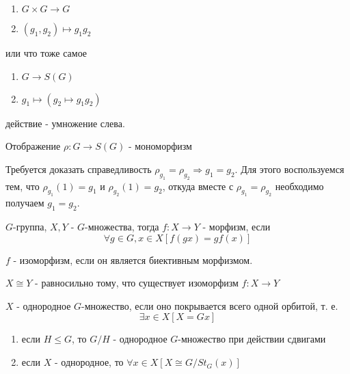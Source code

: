 \begin{enumerate}
\item $G\times G \rightarrow G$

\item $\left(g_1, g_2\right) \mapsto g_1g_2$
\end{enumerate}

или что тоже самое

\begin{enumerate}
\item $G \rightarrow S\left(G\right)$

\item $g_1 \mapsto \left(g_2 \mapsto g_1g_2\right)$
\end{enumerate}

действие - умножение слева.

\begin{Th}[Кэли]
Отображение $\rho : G \rightarrow S\left(G\right)$ - мономорфизм
\end{Th}

\begin{Proof}
Требуется доказать справедливость $\rho_{g_1} = \rho_{g_2} \Rightarrow g_1 = g_2$. Для этого воспользуемся тем, что $\rho_{g_1} \left(1\right) = g_1$ и $\rho_{g_2} \left(1\right) = g_2$, откуда вместе с $\rho_{g_1} = \rho_{g_2}$ необходимо получаем $g_1 = g_2$.
\end{Proof}

\begin{Def}
$G$-группа, $X,Y$ - $G$-множества, тогда $f : X \rightarrow Y$ - морфизм, если
\[
	\forall g \in G, x \in X \left[f\left(g x\right) = g f\left(x\right)\right]
\]
\end{Def}

\begin{Def}
$f$ - изоморфизм, если он является биективным морфизмом.
\end{Def}

\begin{Def}
$X \cong Y$ - равносильно тому, что существует изоморфизм $f : X \rightarrow Y$
\end{Def}

\begin{Def}
$X$ - однородное $G$-множество, если оно покрывается всего одной орбитой, т. е.
\[
	\exists x \in X \left[X = Gx\right]
\]
\end{Def}

\begin{Th}
\begin{enumerate}
\item если $H \le G$, то $G / H$ - однородное $G$-множество при действии сдвигами

\item если $X$ - однородное, то $\forall x \in X \left[X \cong G / St_G\left(x\right)\right]$
\end{enumerate}
\end{Th}

